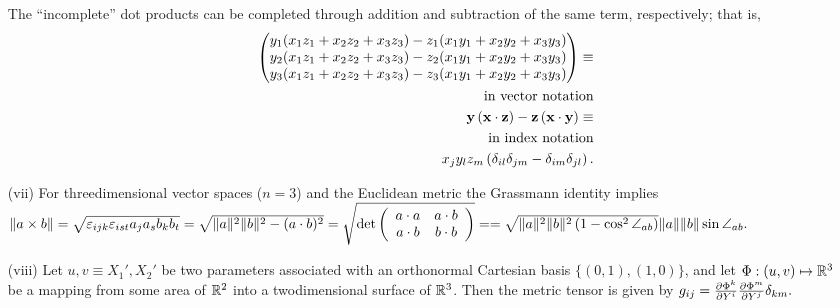 \begin{itemize}
{The ``incomplete''  dot products can be completed through addition and subtraction of the same term, respectively; that is,
\begin{equation}
\begin{split}
\begin{pmatrix}
y_1(x_1z_1 + x_2z_2 + x_3z_3) - z_1(x_1y_1 + x_2y_2 + x_3y_3)   \\
y_2(x_1z_1 + x_2z_2 + x_3z_3) - z_2(x_1y_1 + x_2y_2 + x_3y_3)     \\
y_3(x_1z_1 + x_2z_2 + x_3z_3) - z_3(x_1y_1 + x_2y_2 + x_3y_3)       \\
\end{pmatrix}
\equiv   \\
\textrm{in vector notation}\\
{\bf y} \left( {\bf x} \cdot {\bf z}\right)
-
{\bf z} \left( {\bf x} \cdot {\bf y}\right)
\equiv   \\
\textrm{in index notation}\\
x_j y_l z_m \left(\delta_{il}\delta_{jm}-\delta_{im}\delta_{jl}\right).
\end{split}
\end{equation}
\eproof
}

\item[(vii)]
For threedimensional vector spaces ($n=3$) and the Euclidean metric the Grassmann identity implies\\
$\| a\times b \| =
\sqrt{\varepsilon_{ijk}\varepsilon_{ist}a_j a_s b_k b_t}  =
\sqrt{\| a\|^2
\| b\|^2
-(a\cdot b)^2}=\sqrt{{\rm det}
\left(
\begin{array}{cc}
a\cdot a&a\cdot b\\
a\cdot b&b\cdot b
\end{array}\right)}=
 =
\sqrt{\| a\|^2
\| b\|^2 \left (1- \cos^2 \angle_{ab} \right)}
\| a\|
\| b\|
\sin \angle_{ab}.$
\item[(viii)]
Let $u,v\equiv X_1',X_2'$ be two parameters associated with an
orthonormal Cartesian basis $\{(0,1),(1,0)\}$, and let
$\Phi :(u,v)\mapsto {\Bbb R}^3$
be a mapping from some area of ${\Bbb R}^2$ into a twodimensional
surface of ${\Bbb R}^3$. Then the metric tensor is given by
$g_{ij}=
{\partial \Phi^k \over \partial  Y ^i}
{\partial \Phi^m \over \partial  Y ^j} \delta_{km}.$

\end{itemize}






